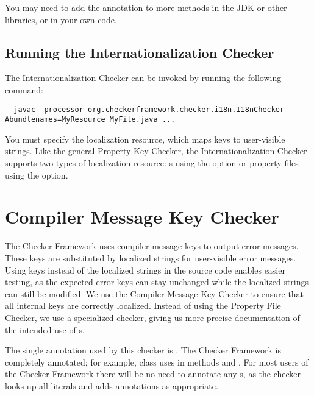 You may need to add the  annotation to more methods in the
JDK or other libraries, or in your own code.


\subsection{Running the Internationalization Checker\label{i18n-running}}

The Internationalization Checker can be invoked by running the following
command:

\begin{smaller}
\begin{Verbatim}
  javac -processor org.checkerframework.checker.i18n.I18nChecker -Abundlenames=MyResource MyFile.java ...
\end{Verbatim}
\end{smaller}

You must specify the localization resource, which maps keys to user-visible
strings.  Like the general Property Key Checker, the Internationalization Checker
supports two types of localization resource:
s using the
 option
or property files using the
 option.



\section{Compiler Message Key Checker\label{compilermsgs-checker}}

The Checker Framework uses compiler message keys to output error messages.
These keys are substituted by localized strings for user-visible error messages.
Using keys instead of the localized strings in the source code enables easier
testing, as the expected error keys can stay unchanged while the localized
strings can still be modified.
We use the Compiler Message Key Checker to ensure that all internal
keys are correctly localized.
Instead of using the Property File Checker, we use a specialized checker,
giving us more precise documentation of the intended use of s.

The single annotation used by this checker is
.
The Checker Framework is completely annotated;
for example, class 
uses  in methods  and .
For most users of the Checker Framework there will be no need to annotate any
s, as the checker looks up all  literals and adds
annotations as appropriate.

